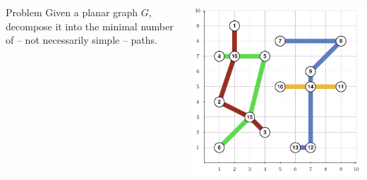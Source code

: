 \begin{frame}[c]
    \frametitle{\problemtitle}
    \begin{columns}[onlytextwidth]
    	\begin{column}[c]{0.6\textwidth}
    		\begin{block}{Problem}
    			Given a planar graph $G$, decompose it into the minimal number of -- not necessarily simple -- paths.
    		\end{block}
    	\end{column}
    	\begin{column}[c]{0.35\textwidth}
    		\includegraphics[width=\linewidth]{sample}%
    	\end{column}
    \end{columns}
\end{frame}

